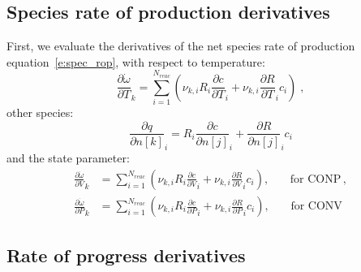 \documentclass[12pt]{article}
\newcommand{\nr}{\ensuremath{{N_{reac}}}}
\newcommand{\conp}{CONP}
\newcommand{\conv}{CONV}
\newcommand{\dconp}{\ensuremath{,\qquad\text{for \conp}}}
\newcommand{\dconv}{\ensuremath{,\qquad\text{for \conv}}}
\begin{document}
\subsection{Species rate of production derivatives}
First, we evaluate the derivatives of the net species rate of production equation~\eqref{e:spec_rop}, with respect to temperature:
\begin{equation}
 \frac{\partial \dot{\omega} }{\partial T }_{k} = \sum_{i=1}^{\nr} \left(\nu_{k,i} R_{i} \frac{\partial c }{\partial T }_{i} + \nu_{k,i} \frac{\partial R }{\partial T }_{i} c_{i}\right) \;,
\end{equation}
other species:
\begin{equation}
 \frac{\partial q }{\partial n[k] }_{i} = R_{i} \frac{\partial c }{\partial n[j] }_{i} + \frac{\partial R }{\partial n[j] }_{i} c_{i}
\end{equation}
and the state parameter:
\begin{subequations}
 \begin{align}
  \frac{\partial \dot{\omega} }{\partial V }_{k} &= \sum_{i=1}^{\nr} \left(\nu_{k,i} R_{i} \frac{\partial c }{\partial V }_{i} + \nu_{k,i} \frac{\partial R }{\partial V }_{i} c_{i}\right)\dconp,\\
  \frac{\partial \dot{\omega} }{\partial P }_{k} &= \sum_{i=1}^{\nr} \left(\nu_{k,i} R_{i} \frac{\partial c }{\partial P }_{i} + \nu_{k,i} \frac{\partial R }{\partial P }_{i} c_{i}\right)\dconv
 \end{align}
\end{subequations}

\subsection{Rate of progress derivatives}
\end{document}
